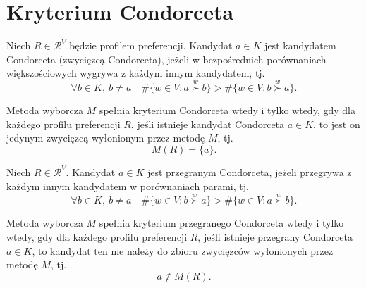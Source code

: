 \documentclass[12pt,a4paper]{mwrep}
\begin{document}
	
	
	
	
	
	\section{Kryterium Condorceta}
	
	\begin{definition}
		\label{def:kandydat-condorceta}
		Niech \(R \in \mathcal{R}^{V}\) będzie profilem preferencji. Kandydat \(a \in K\) jest kandydatem Condorceta (zwycięzcą Condorceta), jeżeli w bezpośrednich porównaniach większościowych wygrywa z każdym innym kandydatem, tj.
		\[
		\forall b \in K,\ b \neq a \quad
		\#\{w \in V : a \overset{w}{\succ} b\}
		>
		\#\{w \in V : b \overset{w}{\succ} a\}.
		\]
	\end{definition}
	
	\begin{definition}
		\label{def:kryterium-condorceta}
		Metoda wyborcza \(M\) spełnia kryterium Condorceta wtedy i tylko wtedy, gdy dla każdego profilu preferencji \(R\), jeśli istnieje kandydat Condorceta \(a \in K\), to jest on jedynym zwycięzcą wyłonionym przez metodę \(M\), tj.
		\[
		M(R) = \{a\}.
		\]
	\end{definition}
	
	\begin{definition}
		\label{def:przegrany-condorceta}
		Niech \(R \in \mathcal{R}^{V}\). Kandydat \(a \in K\) jest przegranym Condorceta, jeżeli przegrywa z każdym innym kandydatem w porównaniach parami, tj.
		\[
		\forall b \in K,\ b \neq a \quad
		\#\{w \in V : b \overset{w}{\succ} a\}
		>
		\#\{w \in V : a \overset{w}{\succ} b\}.
		\]
	\end{definition}

	\begin{definition}
		\label{def:kryterium-przegranego-condorceta}
		Metoda wyborcza \(M\) spełnia kryterium przegranego Condorceta wtedy i tylko wtedy, gdy dla każdego profilu preferencji \(R\), jeśli istnieje przegrany Condorceta \(a \in K\), to kandydat ten nie należy do zbioru zwycięzców wyłonionych przez metodę \(M\), tj.
		\[
		a \notin M(R).
		\]
	\end{definition}
	
\end{document}
